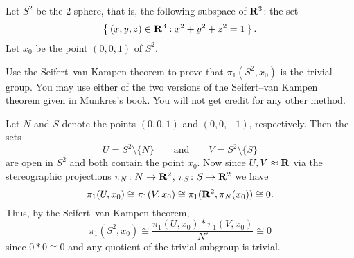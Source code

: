 \begin{problem}
  Let $S^2$ be the $2$-sphere, that is, the following subspace of $\mathbf{R}^3$:
  the set
  \[
    \left\{\,(x,y,z)\in\mathbf{R}^3:x^2+y^2+z^2=1\,\right\}.
  \]
  Let $x_0$ be the point $(0,0,1)$ of $S^2$.


  Use the Seifert--van Kampen theorem to prove that $\pi_1(S^2,x_0)$ is the
  trivial group. You may use either of the two versions of the Seifert--van
  Kampen theorem given in Munkres's book. You will not get credit for any
  other method.
\end{problem}

\begin{solution}
  Let $N$ and $S$ denote the points $(0,0,1)$ and $(0,0,-1)$,
  respectively. Then the sets
  \[
    U=S^2\setminus\{N\}\qquad\text{and}\qquad V=S^2\setminus\{S\}
  \]
  are open in $S^2$ and both contain the point $x_0$. Now since
  $U,V\approx\mathbf{R}$ via the stereographic projections
  $\pi_N\colon N\to\mathbf{R}^2$, $\pi_S\colon S\to\mathbf{R}^2$ we have
  \[
    \pi_1(U,x_0)\cong\pi_1(V,x_0)\cong\pi_1(\mathbf{R}^2,\pi_N(x_0))\cong 0.
  \]
  Thus, by the Seifert--van Kampen theorem,
  \[
    \pi_1(S^2,x_0)\cong\frac{\pi_1(U,x_0)*\pi_1(V,x_0)}{N'}\cong 0
  \]
  since $0*0\cong 0$ and any quotient of the trivial subgroup is trivial.
\end{solution}

